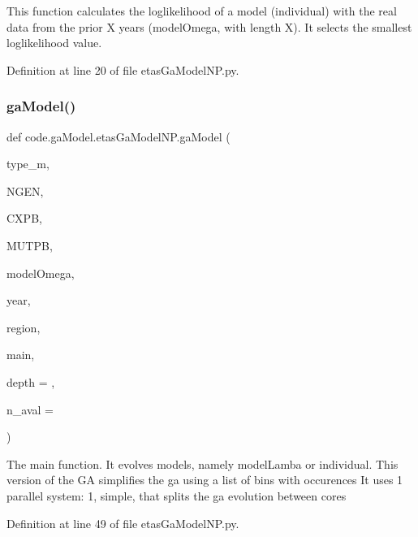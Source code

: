 \begin{DoxyVerb}This function calculates the loglikelihood of a model (individual) with 
the real data from the prior X years (modelOmega, with length X).
It selects the smallest loglikelihood value.
\end{DoxyVerb}
 

Definition at line 20 of file etas\+Ga\+Model\+N\+P.\+py.

\mbox{\label{namespacecode_1_1ga_model_1_1etas_ga_model_n_p_a1198db0e4034344a65eee6f236b13628}} 
\subsubsection{\texorpdfstring{ga\+Model()}{gaModel()}}
{\footnotesize\ttfamily def code.\+ga\+Model.\+etas\+Ga\+Model\+N\+P.\+ga\+Model (\begin{DoxyParamCaption}\item[{}]{type\+\_\+m,  }\item[{}]{N\+G\+EN,  }\item[{}]{C\+X\+PB,  }\item[{}]{M\+U\+T\+PB,  }\item[{}]{model\+Omega,  }\item[{}]{year,  }\item[{}]{region,  }\item[{}]{main,  }\item[{}]{depth = {},  }\item[{}]{n\+\_\+aval = {} }\end{DoxyParamCaption})}

\begin{DoxyVerb}The main function. It evolves models, namely modelLamba or individual. 
This version of the GA simplifies the ga using a list of bins with occurences
It uses 1 parallel system: 1, simple, that splits the ga evolution between cores
\end{DoxyVerb}
 

Definition at line 49 of file etas\+Ga\+Model\+N\+P.\+py.

\mbox{\label{namespacecode_1_1ga_model_1_1etas_ga_model_n_p_a42e39f20622d00169bd4349e4c047585}} 
